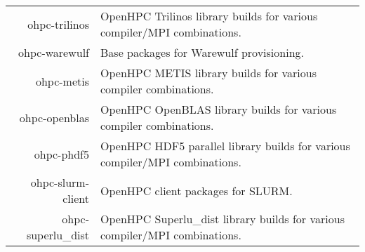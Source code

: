\begin{tabularx}{\textwidth}{r|X}
ohpc-trilinos & OpenHPC Trilinos library builds for various compiler/MPI combinations. \\ 
ohpc-warewulf & Base packages for Warewulf provisioning. \\ 
ohpc-metis & OpenHPC METIS library builds for various compiler combinations. \\ 
ohpc-openblas & OpenHPC OpenBLAS library builds for various compiler combinations. \\ 
ohpc-phdf5 & OpenHPC HDF5 parallel library builds for various compiler/MPI combinations. \\ 
ohpc-slurm-client & OpenHPC client packages for SLURM. \\ 
ohpc-superlu\_dist & OpenHPC Superlu\_dist library builds for various compiler/MPI combinations. \\ 
\bottomrule
\end{tabularx}
